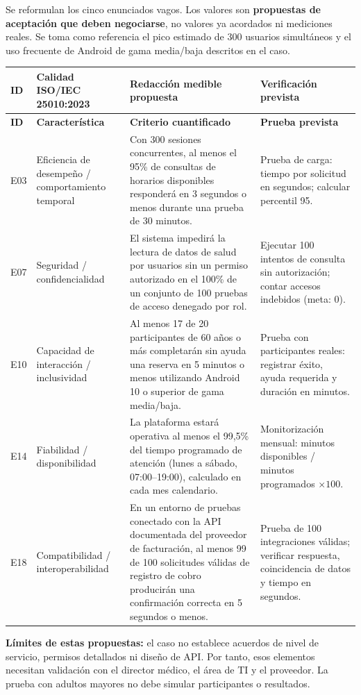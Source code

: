 Se reformulan los cinco enunciados vagos. Los valores son \textbf{propuestas de aceptación que deben negociarse}, no valores ya acordados ni mediciones reales. Se toma como referencia el pico estimado de 300 usuarios simultáneos y el uso frecuente de Android de gama media/baja descritos en el caso.

{\footnotesize
\begin{longtable}{|p{1.0cm}|p{2.5cm}|p{6.4cm}|p{3.6cm}|}
\hline
\textbf{ID} & \textbf{Calidad ISO/IEC 25010:2023} & \textbf{Redacción medible propuesta} & \textbf{Verificación prevista}\\ \hline
\endfirsthead
\hline \textbf{ID} & \textbf{Característica} & \textbf{Criterio cuantificado} & \textbf{Prueba prevista}\\ \hline
\endhead
E03 & Eficiencia de desempeño / comportamiento temporal & Con 300 sesiones concurrentes, al menos el 95\% de consultas de horarios disponibles responderá en 3 segundos o menos durante una prueba de 30 minutos. & Prueba de carga: tiempo por solicitud en segundos; calcular percentil 95. \\ \hline
E07 & Seguridad / confidencialidad & El sistema impedirá la lectura de datos de salud por usuarios sin un permiso autorizado en el 100\% de un conjunto de 100 pruebas de acceso denegado por rol. & Ejecutar 100 intentos de consulta sin autorización; contar accesos indebidos (meta: 0). \\ \hline
E10 & Capacidad de interacción / inclusividad & Al menos 17 de 20 participantes de 60 años o más completarán sin ayuda una reserva en 5 minutos o menos utilizando Android 10 o superior de gama media/baja. & Prueba con participantes reales: registrar éxito, ayuda requerida y duración en minutos. \\ \hline
E14 & Fiabilidad / disponibilidad & La plataforma estará operativa al menos el 99,5\% del tiempo programado de atención (lunes a sábado, 07:00--19:00), calculado en cada mes calendario. & Monitorización mensual: minutos disponibles / minutos programados $\times 100$. \\ \hline
E18 & Compatibilidad / interoperabilidad & En un entorno de pruebas conectado con la API documentada del proveedor de facturación, al menos 99 de 100 solicitudes válidas de registro de cobro producirán una confirmación correcta en 5 segundos o menos. & Prueba de 100 integraciones válidas; verificar respuesta, coincidencia de datos y tiempo en segundos. \\ \hline
\end{longtable}
}

\textbf{Límites de estas propuestas:} el caso no establece acuerdos de nivel de servicio, permisos detallados ni diseño de API. Por tanto, esos elementos necesitan validación con el director médico, el área de TI y el proveedor. La prueba con adultos mayores no debe simular participantes o resultados.
